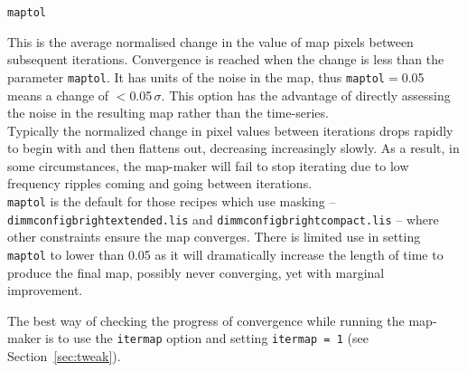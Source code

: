 \documentclass[twoside,11pt]{article}
\renewcommand{\_}{\texttt{\symbol{95}}}
\newcommand{\param}[1]{\texttt{#1}}
\begin{document}
\begin{minipage}[t]{0.1\linewidth}
\texttt{maptol}
\end{minipage}
\begin{minipage}[t]{0.9\linewidth}
This is the average normalised change in the value of map pixels
between subsequent iterations. Convergence is reached when the change
is less than the parameter \texttt{maptol}. It has units of the noise
in the map, thus \texttt{maptol}$=$0.05 means a change of
$<$0.05\,$\sigma$. This option has the advantage of directly assessing
the noise in the resulting map rather than the time-series.
\vspace{3mm}\\
Typically the normalized change in pixel values between iterations
drops rapidly to begin with and then flattens out, decreasing
increasingly slowly. As a result, in some circumstances, the map-maker
will fail to stop iterating due to low frequency ripples coming and
going between iterations.
\vspace{3mm}\\
\texttt{maptol} is the default for those recipes which use
masking -- \texttt{dimmconfig\_bright\_extended.lis} and
\texttt{dimmconfig\_bright\_compact.lis} -- where other constraints
ensure the map converges. There is limited use in setting
\texttt{maptol} to lower than 0.05  as it will dramatically increase
the length of time to produce the final map, possibly never converging,
yet with marginal improvement.
\vspace{3mm}\\
\end{minipage}
The best way of checking the progress of convergence while running the
map-maker is to use the \param{itermap} option and setting
\param{itermap = 1} (see Section~\ref{sec:tweak}).
\end{document}
